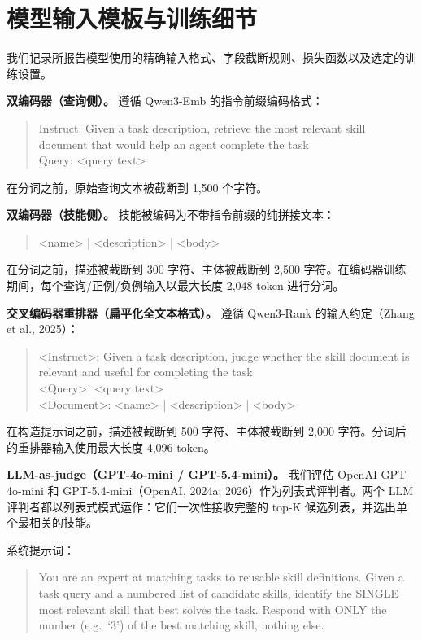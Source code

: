 \documentclass[11pt,UTF8,fontset=fandol]{ctexart}
\begin{document}
\section{模型输入模板与训练细节}

我们记录所报告模型使用的精确输入格式、字段截断规则、损失函数以及选定的训练设置。

\textbf{双编码器（查询侧）。} 遵循 Qwen3-Emb 的指令前缀编码格式：
\begin{quote}\ttfamily\small
Instruct: Given a task description, retrieve the most relevant skill document that would help an agent complete the task\\
Query: {\textless}query text{\textgreater}
\end{quote}
在分词之前，原始查询文本被截断到 1,500 个字符。

\textbf{双编码器（技能侧）。} 技能被编码为不带指令前缀的纯拼接文本：
\begin{quote}\ttfamily\small
{\textless}name{\textgreater} | {\textless}description{\textgreater} | {\textless}body{\textgreater}
\end{quote}
在分词之前，描述被截断到 300 字符、主体被截断到 2,500 字符。在编码器训练期间，每个查询/正例/负例输入以最大长度 2,048 token 进行分词。

\textbf{交叉编码器重排器（扁平化全文本格式）。} 遵循 Qwen3-Rank 的输入约定（Zhang et al., 2025）：
\begin{quote}\ttfamily\small
{\textless}Instruct{\textgreater}: Given a task description, judge whether the skill document is relevant and useful for completing the task\\
{\textless}Query{\textgreater}: {\textless}query text{\textgreater}\\
{\textless}Document{\textgreater}: {\textless}name{\textgreater} | {\textless}description{\textgreater} | {\textless}body{\textgreater}
\end{quote}
在构造提示词之前，描述被截断到 500 字符、主体被截断到 2,000 字符。分词后的重排器输入使用最大长度 4,096 token。

\textbf{LLM-as-judge（GPT-4o-mini / GPT-5.4-mini）。} 我们评估 OpenAI GPT-4o-mini 和 GPT-5.4-mini（OpenAI, 2024a; 2026）作为列表式评判者。两个 LLM 评判者都以列表式模式运作：它们一次性接收完整的 top-K 候选列表，并选出单个最相关的技能。

系统提示词：
\begin{quote}\small
You are an expert at matching tasks to reusable skill definitions. Given a task query and a numbered list of candidate skills, identify the SINGLE most relevant skill that best solves the task. Respond with ONLY the number (e.g.\ `3') of the best matching skill, nothing else.
\end{quote}
\end{document}
